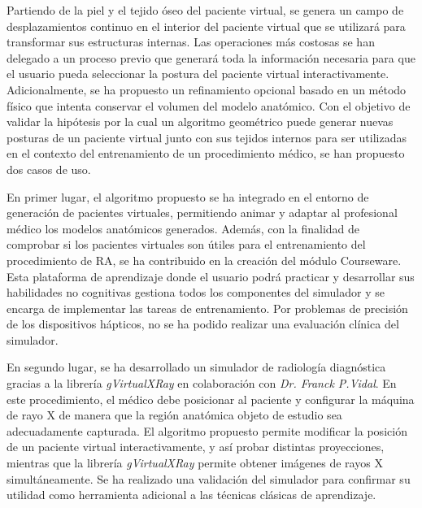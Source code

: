 Partiendo de la piel y el tejido óseo del paciente virtual, se genera un campo de desplazamientos continuo en el interior del paciente virtual que se utilizará para transformar sus estructuras internas. Las operaciones más costosas se han delegado a un proceso previo que generará toda la información necesaria para que el usuario pueda seleccionar la postura del paciente virtual interactivamente. Adicionalmente, se ha propuesto un refinamiento opcional basado en un método físico que intenta conservar el volumen del modelo anatómico. Con el objetivo de validar la hipótesis por la cual un algoritmo geométrico puede generar nuevas posturas de un paciente virtual junto con sus tejidos internos para ser utilizadas en el contexto del entrenamiento de un procedimiento médico, se han propuesto dos casos de uso. 

En primer lugar, el algoritmo propuesto se ha integrado en el entorno de generación de pacientes virtuales, permitiendo animar y adaptar al profesional médico los modelos anatómicos generados. Además, con la finalidad de comprobar si los pacientes virtuales son útiles para  el entrenamiento del procedimiento de RA, se ha contribuido en la creación del módulo Courseware. Esta plataforma de aprendizaje donde el usuario podrá practicar y desarrollar sus habilidades no cognitivas gestiona todos los componentes del simulador y se encarga de implementar las tareas de entrenamiento. Por problemas de precisión de los dispositivos hápticos, no se ha podido realizar una evaluación clínica del simulador. 



En segundo lugar, se ha desarrollado un simulador de radiología diagnóstica gracias a la librería \emph{gVirtualXRay} en colaboración con \emph{Dr. Franck P.Vidal}. En este procedimiento, el médico debe posicionar al paciente y configurar la máquina de rayo X de manera que la región anatómica objeto de estudio sea adecuadamente capturada. El algoritmo propuesto permite modificar la posición de un paciente virtual interactivamente, y así probar distintas proyecciones, mientras que la librería \emph{gVirtualXRay} permite  obtener imágenes de rayos X simultáneamente. Se ha realizado una validación del simulador para confirmar su utilidad como herramienta adicional a las técnicas clásicas de aprendizaje.

